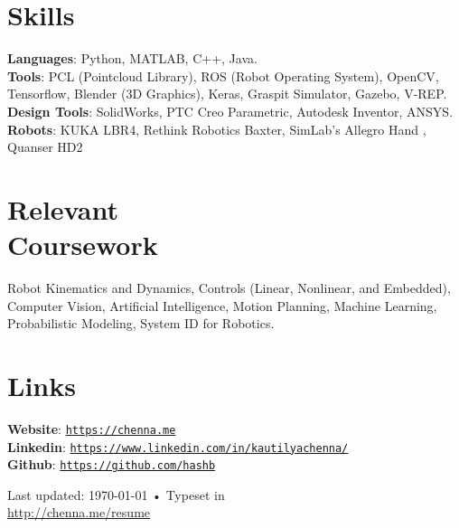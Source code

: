 \documentclass[letterpaper, margin, line]{resume}
\begin{document}
\begin{resume}
    \section{\mysidestyle Skills} 

    \textbf{Languages}: Python, MATLAB, C++, Java. \\[1mm]
    \textbf{Tools}: PCL (Pointcloud Library), ROS (Robot Operating System), OpenCV, Tensorflow, Blender (3D Graphics), Keras, Graspit Simulator, Gazebo, V-REP. \\[1mm]
    \textbf{Design Tools}: SolidWorks, PTC Creo Parametric, Autodesk Inventor, ANSYS. \\[1mm]
    \textbf{Robots}: KUKA LBR4, Rethink Robotics Baxter, SimLab's Allegro Hand , Quanser HD2
    
    \section{\mysidestyle Relevant\\Coursework}
    Robot Kinematics and Dynamics, Controls (Linear, Nonlinear, and Embedded), Computer Vision, Artificial Intelligence, Motion Planning, Machine Learning, Probabilistic Modeling, System ID for Robotics.
    
    
    \section{\mysidestyle Links}
	\textbf{Website}: \texttt{\href{https://chenna.me}{https://chenna.me}} \\[1mm]
    \textbf{Linkedin}: \texttt{\href{https://www.linkedin.com/in/kautilyachenna/}{https://www.linkedin.com/in/kautilyachenna/}}\\[1mm]
    \textbf{Github}: \texttt{\href{https://github.com/hashb}{https://github.com/hashb}}
    

\begin{center}
	{\scriptsize  Last updated: \today\- •\- Typeset in \href{}{
			\XeTeX }\\
		\href{http://chenna.me/resume}{http://chenna.me/resume}}
\end{center}

\end{resume}
\end{document}
